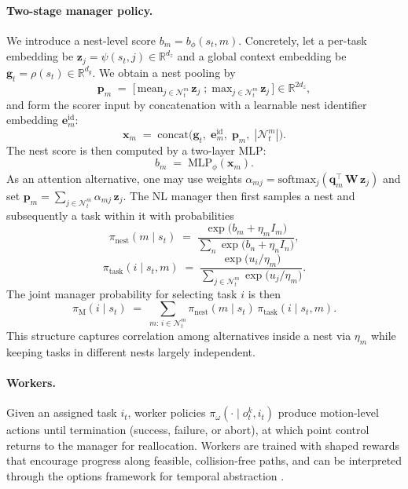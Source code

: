 \documentclass[journal,onecolumn]{IEEEtran}
\begin{document}
\paragraph{Two-stage manager policy.} We introduce a nest-level score \(b_m=b_\phi(s_t,m)\). Concretely, let a per-task embedding be \(\mathbf{z}_j = \psi(s_t,j) \in \mathbb{R}^{d_z}\) and a global context embedding be \(\mathbf{g}_t = \rho(s_t) \in \mathbb{R}^{d_g}\). We obtain a nest pooling by
\[ \mathbf{p}_m\;=\;\big[\,\mathrm{mean}_{j\in\mathcal{N}^m_t}\, \mathbf{z}_j\;;\;\mathrm{max}_{j\in\mathcal{N}^m_t}\, \mathbf{z}_j\,\big] \in \mathbb{R}^{2d_z}, \]
and form the scorer input by concatenation with a learnable nest identifier embedding \(\mathbf{e}^{\mathrm{id}}_m\):
\[ \mathbf{x}_m\;=\;\mathrm{concat}\big(\mathbf{g}_t,\; \mathbf{e}^{\mathrm{id}}_m,\; \mathbf{p}_m,\; |\mathcal{N}^m_t|\big). \]
The nest score is then computed by a two-layer MLP:
\[ b_m\;=\;\mathrm{MLP}_{\phi}(\mathbf{x}_m). \]
As an attention alternative, one may use weights \(\alpha_{mj}=\mathrm{softmax}_j(\mathbf{q}_m^{\top}\,\mathbf{W}\,\mathbf{z}_j)\) and set \(\mathbf{p}_m=\sum_{j\in\mathcal{N}^m_t}\alpha_{mj}\,\mathbf{z}_j\). The NL manager then first samples a nest and subsequently a task within it with probabilities
\[ \pi_{\mathrm{nest}}(m\mid s_t)\;=\;\frac{\exp\big(b_m + \eta_m I_m\big)}{\sum_{n} \exp\big(b_n + \eta_n I_n\big)}, \]
\[ \pi_{\mathrm{task}}(i\mid s_t,m)\;=\;\frac{\exp\big( u_i/\eta_m \big)}{\sum_{j\in\mathcal{N}^m_t} \exp\big( u_j/\eta_m \big)}. \]
The joint manager probability for selecting task \(i\) is then
\[ \pi_{\mathrm{M}}(i\mid s_t)\;=\;\sum_{m:\, i\in\mathcal{N}^m_t} \pi_{\mathrm{nest}}(m\mid s_t)\, \pi_{\mathrm{task}}(i\mid s_t,m). \]
This structure captures correlation among alternatives inside a nest via \(\eta_m\) while keeping tasks in different nests largely independent.

\paragraph{Workers.} Given an assigned task \(i_t\), worker policies \(\pi_\omega(\cdot\mid o^k_t, i_t)\) produce motion-level actions until termination (success, failure, or abort), at which point control returns to the manager for reallocation. Workers are trained with shaped rewards that encourage progress along feasible, collision-free paths, and can be interpreted through the options framework for temporal abstraction \citep{sutton1999options}.
\end{document}
